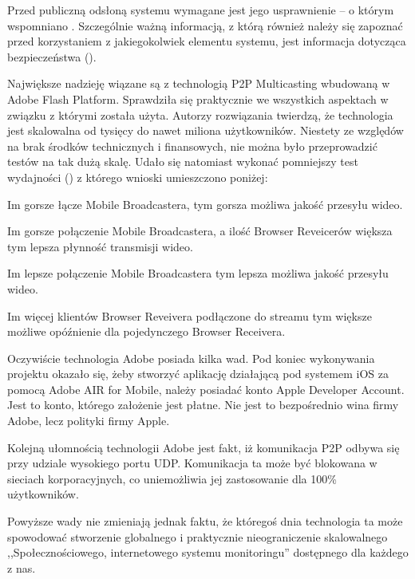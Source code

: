 Przed publiczną odsłoną systemu wymagane jest jego usprawnienie -- o którym wspomniano . Szczególnie ważną informacją, z którą również należy się zapoznać przed korzystaniem z jakiegokolwiek elementu systemu, jest informacja dotycząca bezpieczeństwa ().

Największe nadzieję wiązane są z technologią P2P Multicasting wbudowaną w Adobe Flash Platform. Sprawdziła się praktycznie we wszystkich aspektach w związku z którymi została użyta. Autorzy rozwiązania \cite{MattKauf2009} twierdzą, że technologia jest skalowalna od tysięcy do nawet miliona użytkowników. Niestety ze względów na brak środków technicznych i finansowych, nie można było przeprowadzić testów na tak dużą skalę. Udało się natomiast wykonać pomniejszy test wydajności () z którego wnioski umieszczono poniżej:

\begin{packed_item}
    \item{Im gorsze łącze Mobile Broadcastera, tym gorsza możliwa jakość przesyłu wideo.}
    \item{Im gorsze połączenie Mobile Broadcastera, a ilość Browser Reveicerów większa tym lepsza płynność transmisji wideo.}
    \item{Im lepsze połączenie Mobile Broadcastera tym lepsza możliwa jakość przesyłu wideo.}
    \item{Im więcej klientów Browser Reveivera podłączone do streamu tym większe możliwe opóźnienie dla pojedynczego Browser Receivera.}
\end{packed_item}

Oczywiście technologia Adobe posiada kilka wad. Pod koniec wykonywania projektu okazało się, żeby stworzyć aplikację działającą pod systemem iOS za pomocą Adobe AIR for Mobile, należy posiadać konto Apple Developer Account. Jest to konto, którego założenie jest płatne. Nie jest to bezpośrednio wina firmy Adobe, lecz polityki firmy Apple.

Kolejną ułomnością technologii Adobe jest fakt, iż komunikacja P2P odbywa się przy udziale wysokiego portu UDP. Komunikacja ta może być blokowana w sieciach korporacyjnych, co uniemożliwia jej zastosowanie dla 100\% użytkowników.

Powyższe wady nie zmieniają jednak faktu, że któregoś dnia technologia ta może spowodować stworzenie globalnego i praktycznie nieograniczenie skalowalnego ,,Społecznościowego, internetowego systemu monitoringu'' dostępnego dla każdego z nas.

\newpage
